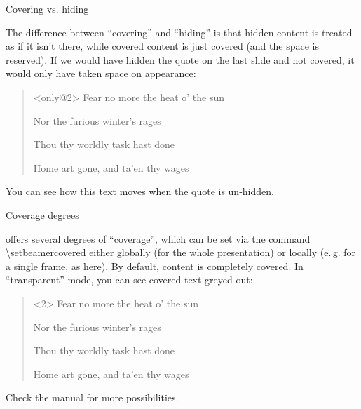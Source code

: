 \documentclass[english]{beamer}
\begin{document}
%
\begin{frame}{Covering vs. hiding}

The difference between ``covering'' and ``hiding'' is that hidden
content is treated as if it isn't there, while covered content is
just covered (and the space is reserved). If we would have hidden
the quote on the last slide and not covered, it would only have taken
space on appearance:
\begin{quote}<only@2>
Fear no more the heat o\textquoteright{} the sun

Nor the furious winter\textquoteright s rages

Thou thy worldly task hast done

Home art gone, and ta\textquoteright en thy wages
\end{quote}

You can see how this text moves when the quote is un-hidden.
\end{frame}
%
\begin{frame}{Coverage degrees}


 offers several degrees of ``coverage'', which
can be set via the command \alert{\textbackslash setbeamercovered}
either globally (for the whole presentation) or locally (e.\,g. for
a single frame, as here). By default, content is completely covered.
In ``transparent'' mode, you can see covered text greyed-out:
\begin{quote}<2>
Fear no more the heat o\textquoteright{} the sun

Nor the furious winter\textquoteright s rages

Thou thy worldly task hast done

Home art gone, and ta\textquoteright en thy wages
\end{quote}
Check the  manual for more possibilities.
\end{frame}
%
\end{document}
